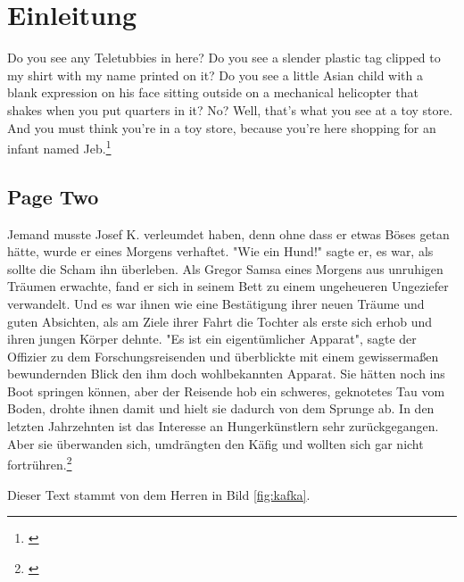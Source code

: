 \chapter{Einleitung}\label{chapter:einleitung}


Do you see any Teletubbies in here? Do you see a slender plastic tag clipped to my shirt with my name printed on it? Do you see a little Asian child with a blank expression on his face sitting outside on a mechanical helicopter that shakes when you put quarters in it? No? Well, that's what you see at a toy store. And you must think you're in a toy store, because you're here shopping for an infant named Jeb.\footnote{\citet{Wartena2015}}

\newpage

\section{Page Two}\label{sec:page_two}

Jemand musste Josef K. verleumdet haben, denn ohne dass er etwas Böses getan hätte, wurde er eines Morgens verhaftet. "Wie ein Hund!" sagte er, es war, als sollte die Scham ihn überleben. Als Gregor Samsa eines Morgens aus unruhigen Träumen erwachte, fand er sich in seinem Bett zu einem ungeheueren Ungeziefer verwandelt. Und es war ihnen wie eine Bestätigung ihrer neuen Träume und guten Absichten, als am Ziele ihrer Fahrt die Tochter als erste sich erhob und ihren jungen Körper dehnte. "Es ist ein eigentümlicher Apparat", sagte der Offizier zu dem Forschungsreisenden und überblickte mit einem gewissermaßen bewundernden Blick den ihm doch wohlbekannten Apparat. Sie hätten noch ins Boot springen können, aber der Reisende hob ein schweres, geknotetes Tau vom Boden, drohte ihnen damit und hielt sie dadurch von dem Sprunge ab. In den letzten Jahrzehnten ist das Interesse an Hungerkünstlern sehr zurückgegangen. Aber sie überwanden sich, umdrängten den Käfig und wollten sich gar nicht fortrühren.\footnote{\citet{Bottou2014}}

Dieser Text stammt von dem Herren in Bild \ref{fig:kafka}.

